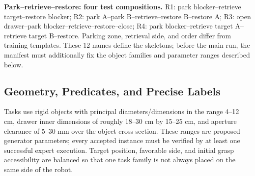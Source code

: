 \documentclass[
  10pt,
]{article}
\begin{document}
\textbf{Park--retrieve--restore: four test compositions.} R1: park blocker--retrieve target--restore blocker; R2: park A--park B--retrieve--restore B--restore A; R3: open drawer--park blocker--retrieve--restore--close; R4: park blocker--retrieve target A--retrieve target B--restore. Parking zone, retrieval side, and order differ from training templates. These 12 names define the skeletons; before the main run, the manifest must additionally fix the object families and parameter ranges described below.

\hypertarget{geometry-predicates-vuxe0-label-chuxednh-xuxe1c}{%
\subsection{Geometry, Predicates, and Precise Labels}\label{geometry-predicates-vuxe0-label-chuxednh-xuxe1c}}

Tasks use rigid objects with principal diameters/dimensions in the range 4--12 cm, drawer inner dimensions of roughly 18--30 cm by 15--25 cm, and aperture clearance of 5--30 mm over the object cross-section. These ranges are proposed generator parameters; every accepted instance must be verified by at least one successful expert execution. Target position, favorable side, and initial grasp accessibility are balanced so that one task family is not always placed on the same side of the robot.
\end{document}
